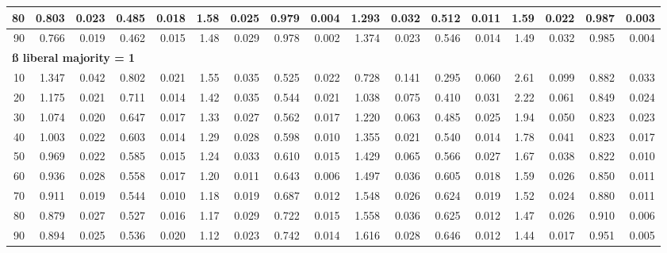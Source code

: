 \documentclass[
]{article}
\begin{document}
\begin{table}[H]
\begin{table}
{\begin{tabular}{r|r|r|r|r|r|r|r|r|r|r|r|r|r|r|r|r}
\hline
\hspace{1em}80 & 0.803 & 0.023 & 0.485 & 0.018 & 1.58 & 0.025 & 0.979 & 0.004 & 1.293 & 0.032 & 0.512 & 0.011 & 1.59 & 0.022 & 0.987 & 0.003\\
\hline
\hspace{1em}90 & 0.766 & 0.019 & 0.462 & 0.015 & 1.48 & 0.029 & 0.978 & 0.002 & 1.374 & 0.023 & 0.546 & 0.014 & 1.49 & 0.032 & 0.985 & 0.004\\
\hline
\multicolumn{17}{l}{\textbf{ß liberal majority = 1}}\\
\hline
\hspace{1em}10 & 1.347 & 0.042 & 0.802 & 0.021 & 1.55 & 0.035 & 0.525 & 0.022 & 0.728 & 0.141 & 0.295 & 0.060 & 2.61 & 0.099 & 0.882 & 0.033\\
\hline
\hspace{1em}20 & 1.175 & 0.021 & 0.711 & 0.014 & 1.42 & 0.035 & 0.544 & 0.021 & 1.038 & 0.075 & 0.410 & 0.031 & 2.22 & 0.061 & 0.849 & 0.024\\
\hline
\hspace{1em}30 & 1.074 & 0.020 & 0.647 & 0.017 & 1.33 & 0.027 & 0.562 & 0.017 & 1.220 & 0.063 & 0.485 & 0.025 & 1.94 & 0.050 & 0.823 & 0.023\\
\hline
\hspace{1em}40 & 1.003 & 0.022 & 0.603 & 0.014 & 1.29 & 0.028 & 0.598 & 0.010 & 1.355 & 0.021 & 0.540 & 0.014 & 1.78 & 0.041 & 0.823 & 0.017\\
\hline
\hspace{1em}50 & 0.969 & 0.022 & 0.585 & 0.015 & 1.24 & 0.033 & 0.610 & 0.015 & 1.429 & 0.065 & 0.566 & 0.027 & 1.67 & 0.038 & 0.822 & 0.010\\
\hline
\hspace{1em}60 & 0.936 & 0.028 & 0.558 & 0.017 & 1.20 & 0.011 & 0.643 & 0.006 & 1.497 & 0.036 & 0.605 & 0.018 & 1.59 & 0.026 & 0.850 & 0.011\\
\hline
\hspace{1em}70 & 0.911 & 0.019 & 0.544 & 0.010 & 1.18 & 0.019 & 0.687 & 0.012 & 1.548 & 0.026 & 0.624 & 0.019 & 1.52 & 0.024 & 0.880 & 0.011\\
\hline
\hspace{1em}80 & 0.879 & 0.027 & 0.527 & 0.016 & 1.17 & 0.029 & 0.722 & 0.015 & 1.558 & 0.036 & 0.625 & 0.012 & 1.47 & 0.026 & 0.910 & 0.006\\
\hline
\hspace{1em}90 & 0.894 & 0.025 & 0.536 & 0.020 & 1.12 & 0.023 & 0.742 & 0.014 & 1.616 & 0.028 & 0.646 & 0.012 & 1.44 & 0.017 & 0.951 & 0.005\\

\end{tabular}}
\end{table}
\end{table}
\end{document}
